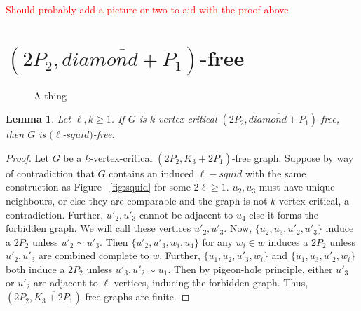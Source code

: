 \documentclass[11pt]{article}
\newtheorem{lemma}[theorem]{Lemma}
\theoremstyle{definition}
\begin{document}
\textcolor{red}{Should probably add a picture or two to aid with the proof above.}

\section{$(2P_2, \overline{diamond + P_1})$-free}

\begin{figure}[h]
\def\r{1.5}
\centering
{}
\caption{A thing}
\end{figure}

\begin{lemma}\label{lem:compdiamondplusP1}
Let $\ell,k\ge 1$. If $G$ is $k$-vertex-critical $(2P_2, \overline{diamond+P_1})$-free, then $G$ is $(\ell$-$squid)$-free.
\end{lemma}
\begin{proof}
Let $G$ be a $k$-vertex-critical $(2P_2, \overline{K_3 + 2P_1})$-free graph. Suppose by way of contradiction that $G$ contains an induced $\ell-squid$ with the same construction as Figure ~\ref{fig:squid} for some $2\ell \geq 1$.
$u_2, u_3$ must have unique neighbours, or else they are comparable and the graph is not $k$-vertex-critical, a contradiction. Further, $u'_2, u'_3$ cannot be adjacent to $u_4$ else it forms the forbidden graph. We will call these vertices $u'_2, u'_3$. Now, $\{ u_2, u_3, u'_2, u'_3 \}$ induce a $2P_2$ unless $u'_2 \sim u'_3$. Then $\{ u'_2, u'_3, w_i, u_4 \}$ for any $w_i \in w$ induces a $2P_2$ unless $u'_2, u'_3$ are combined complete to $w$. Further, $\{ u_1, u_2, u'_3, w_i \}$ and $\{ u_1, u_3, u'_2, w_i \}$ both induce a $2P_2$ unless $u'_3, u'_2 \sim u_1$. Then by pigeon-hole principle, either $u'_3$ or $u'_2$ are adjacent to $\ell$ vertices, inducing the forbidden graph. Thus, $(2P_2, \overline{K_3 + 2P_1})$-free graphs are finite.
\end{proof}
\end{document}
